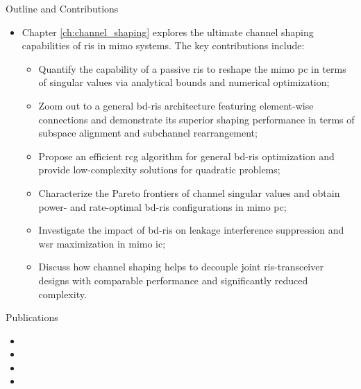 \begin{section}{Outline and Contributions}
\begin{itemize}
\begin{itemize}
			\item Integrate backscatter modulation and passive beamforming seamlessly into the input distribution design that allows arbitrary trade-off in between;
			\item Propose a low-complexity cooperative receiver that sequentially decodes both coexisting links and exploits backscatter detection as part of channel training;
			\item Characterize the achievable primary-backscatter rate region over different designs of input distribution at the scatter nodes, active beamforming at the \gls{ap}, and energy detector at the receiver;
			\item Discuss the impact of practical factors such as the number of scatter nodes and states, transmit antenna size, backscatter symbol duration, and \gls{snr} on the system performance.
		\end{itemize}
		\item Chapter \ref{ch:channel_shaping} explores the ultimate channel shaping capabilities of \gls{ris} in \gls{mimo} systems. The key contributions include:
		\begin{itemize}
			\item Quantify the capability of a passive \gls{ris} to reshape the \gls{mimo} \gls{pc} in terms of singular values via analytical bounds and numerical optimization;
			\item Zoom out to a general \gls{bd}-\gls{ris} architecture featuring element-wise connections and demonstrate its superior shaping performance in terms of subspace alignment and subchannel rearrangement;
			\item Propose an efficient \gls{rcg} algorithm for general \gls{bd}-\gls{ris} optimization and provide low-complexity solutions for quadratic problems;
			\item Characterize the Pareto frontiers of channel singular values and obtain power- and rate-optimal \gls{bd}-\gls{ris} configurations in \gls{mimo} \gls{pc};
			\item Investigate the impact of \gls{bd}-\gls{ris} on leakage interference suppression and \gls{wsr} maximization in \gls{mimo} \gls{ic};
			\item Discuss how channel shaping helps to decouple joint \gls{ris}-transceiver designs with comparable performance and significantly reduced complexity.
		\end{itemize}
	\end{itemize}
\end{section}

\begin{section}{Publications}
	\begin{itemize}
		\item {}
		\item {}
		\item {}
		\item {}
	\end{itemize}
\end{section}
